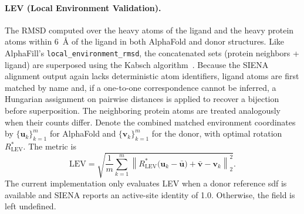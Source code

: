 \paragraph{LEV (Local Environment Validation).} The RMSD
computed over the heavy atoms of the ligand and the heavy protein atoms within
6~\AA{} of the ligand in both AlphaFold and donor structures. Like
AlphaFill's \nolinkurl{local_environment_rmsd}, the concatenated
sets (protein neighbors + ligand) are superposed using the Kabsch algorithm~\cite{kabschSolutionBestRotation1976a,kabschDiscussionSolutionBest1978}. Because the SIENA alignment output again lacks deterministic atom identifiers, ligand atoms are first matched by name and, if a one-to-one correspondence cannot be inferred, a Hungarian assignment on pairwise distances is applied to recover a bijection before superposition. The neighboring protein atoms are treated analogously when their counts differ. Denote the combined matched environment coordinates by
\(\{\mathbf{u}_k\}_{k=1}^{m}\) for AlphaFold and \(\{\mathbf{v}_k\}_{k=1}^{m}\) for the donor, with
optimal rotation \(R^*_\mathrm{LEV}\). The metric is
\begin{equation}
    \mathrm{LEV} = \sqrt{\frac{1}{m} \sum_{k=1}^{m} \left\| R^*_\mathrm{LEV}\bigl(\mathbf{u}_k - \bar{\mathbf{u}}\bigr) + \bar{\mathbf{v}} - \mathbf{v}_k \right\|_2^2 }.
\end{equation}
The current implementation only evaluates LEV when a donor reference \gls{sdf} is available and SIENA reports an active-site identity of 1.0. Otherwise, the field is left undefined.

